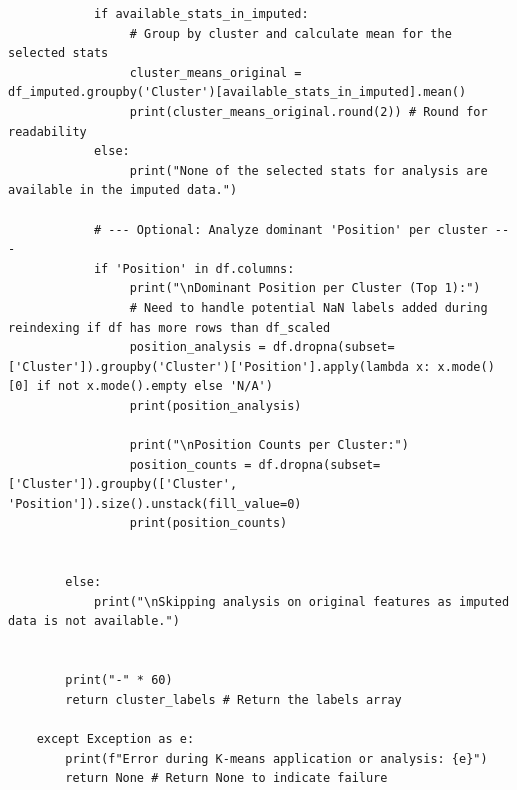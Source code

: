 \documentclass[12pt]{report}
\begin{document}
{{{\begin{lstlisting}
            if available_stats_in_imputed:
                 # Group by cluster and calculate mean for the selected stats
                 cluster_means_original = df_imputed.groupby('Cluster')[available_stats_in_imputed].mean()
                 print(cluster_means_original.round(2)) # Round for readability
            else:
                 print("None of the selected stats for analysis are available in the imputed data.")

            # --- Optional: Analyze dominant 'Position' per cluster ---
            if 'Position' in df.columns:
                 print("\nDominant Position per Cluster (Top 1):")
                 # Need to handle potential NaN labels added during reindexing if df has more rows than df_scaled
                 position_analysis = df.dropna(subset=['Cluster']).groupby('Cluster')['Position'].apply(lambda x: x.mode()[0] if not x.mode().empty else 'N/A')
                 print(position_analysis)

                 print("\nPosition Counts per Cluster:")
                 position_counts = df.dropna(subset=['Cluster']).groupby(['Cluster', 'Position']).size().unstack(fill_value=0)
                 print(position_counts)


        else:
            print("\nSkipping analysis on original features as imputed data is not available.")


        print("-" * 60)
        return cluster_labels # Return the labels array

    except Exception as e:
        print(f"Error during K-means application or analysis: {e}")
        return None # Return None to indicate failure


\end{lstlisting}}}}
\end{document}
